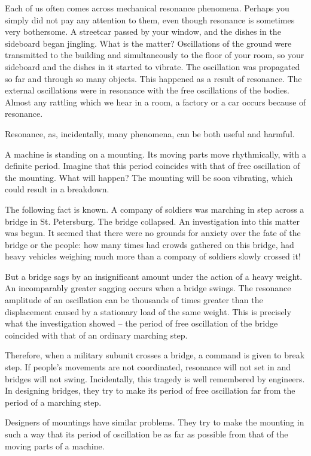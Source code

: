 Each of us often comes across mechanical resonance
phenomena. Perhaps you simply did not pay any attention to them, even though resonance is sometimes very
bothersome. A streetcar passed by your window, and the
dishes in the sideboard began jingling. What is the matter? Oscillations of the ground were transmitted to the
building and simultaneously to the floor of your room,
so your sideboard and the dishes in it started to vibrate.
The oscillation was propagated so far and through so
many objects. This happened as a result of resonance.
The external oscillations were in resonance with the free
oscillations of the bodies. Almost any rattling which
we hear in a room, a factory or a car occurs because of
resonance.

Resonance, as, incidentally, many phenomena, can be
both useful and harmful.

A machine is standing on a mounting. Its moving parts
move rhythmically, with a definite period. Imagine that
this period coincides with that of free oscillation of the
mounting. What will happen? The mounting will be soon
vibrating, which could result in a breakdown.

The following fact is known. A company of soldiers
was marching in step across a bridge in St. Petersburg.
The bridge collapsed. An investigation into this matter
was begun. It seemed that there were no grounds for
anxiety over the fate of the bridge or the people: how
many times had crowds gathered on this bridge, had heavy
vehicles weighing much more than a company of soldiers
slowly crossed it!

But a bridge sags by an insignificant amount under the
action of a heavy weight. An incomparably greater sagging occurs when a bridge swings. The resonance amplitude of an oscillation can be thousands of times greater than
the displacement caused by a stationary load of the same
weight. This is precisely what the investigation showed --
the period of free oscillation of the bridge coincided with
that of an ordinary marching step.

Therefore, when a military subunit crosses a bridge,
a command is given to break step. If people's movements
are not coordinated, resonance will not set in and bridges
will not swing. Incidentally, this tragedy is well remembered by engineers. In designing bridges, they try to make its period of free oscillation far from the period of a marching step.

Designers of mountings have similar problems. They
try to make the mounting in such a way that its period
of oscillation be as far as possible from that of the moving
parts of a machine.
